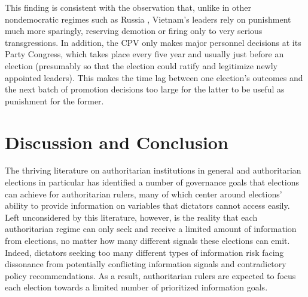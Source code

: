 \documentclass[12pt]{article}
\newcommand{\1}{\mathbbm{1}}
\begin{document}
This finding is consistent with the observation that, unlike in other nondemocratic regimes such as Russia \citep{Myagkov2009}, Vietnam's leaders rely on punishment much more sparingly, reserving demotion or firing only to very serious transgressions. %
In addition, the CPV only makes major personnel decisions at its Party Congress, which takes place every five year and usually just before an election (presumably so that the election could ratify and legitimize newly appointed leaders). This makes the time lag between one election's outcomes and the next batch of promotion decisions too large for the latter to be useful as punishment for the former.

\section{Discussion and Conclusion}

The thriving literature on authoritarian institutions in general and authoritarian elections in particular has identified a number of governance goals that elections can achieve for authoritarian rulers, many of which center around elections' ability to provide information on variables that dictators cannot access easily. Left unconsidered by this literature, however, is the reality that each authoritarian regime can only seek and receive a limited amount of information from elections, no matter how many different signals these elections can emit. Indeed, dictators seeking too many different types of information risk facing dissonance from potentially conflicting information signals and contradictory policy recommendations. As a result, authoritarian rulers are expected to focus each election towards a limited number of prioritized information goals.
\end{document}
